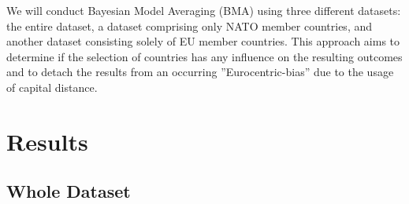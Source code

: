 \documentclass[12pt,a4paper]{article}
\begin{document}
We will conduct Bayesian Model Averaging (BMA) using three different datasets: the entire dataset, a dataset comprising only NATO member countries, and another dataset consisting solely of EU member countries. This approach aims to determine if the selection of countries has any influence on the resulting outcomes and to detach the results from an occurring ''Eurocentric-bias'' due to the usage of capital distance. \\

 
\section{Results}
\subsection{Whole Dataset}
\end{document}
